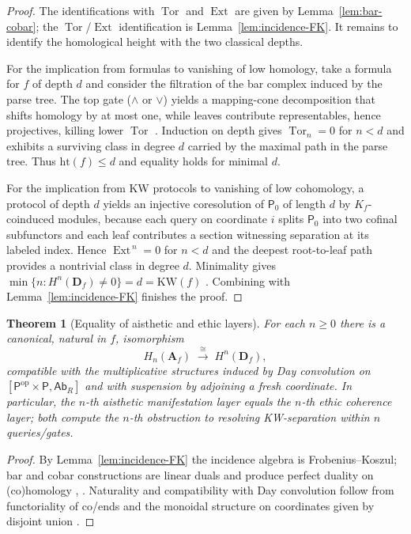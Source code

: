 \documentclass[12pt]{article}
\DeclareMathOperator{\Tor}{Tor}
\newcommand{\Ab}{\mathsf{Ab}}
\newcommand{\Ext}{\operatorname{Ext}}
\newcommand{\op}{\mathrm{op}}
\theoremstyle{plain}
\newtheorem{theorem}{Theorem}[section]
\theoremstyle{definition}
\theoremstyle{remark}
\numberwithin{equation}{section}
\begin{document}
\begin{proof}
The identifications with $\Tor$ and $\Ext$ are given by Lemma~\ref{lem:bar-cobar}; the $\Tor$/$\Ext$ identification is Lemma~\ref{lem:incidence-FK}. It remains to identify the homological height with the two classical depths.

For the implication from formulas to vanishing of low homology, take a formula for $f$ of depth $d$ and consider the filtration of the bar complex induced by the parse tree. The top gate ($\wedge$ or $\vee$) yields a mapping-cone decomposition that shifts homology by at most one, while leaves contribute representables, hence projectives, killing lower $\Tor$ \cite{Weibel1994}. Induction on depth gives $\Tor_n=0$ for $n<d$ and exhibits a surviving class in degree $d$ carried by the maximal path in the parse tree. Thus $\mathrm{ht}(f)\le d$ and equality holds for minimal $d$.

For the implication from KW protocols to vanishing of low cohomology, a protocol of depth $d$ yields an injective coresolution of $\mathsf P_0$ of length $d$ by $K_f$-coinduced modules, because each query on coordinate $i$ splits $\mathsf P_0$ into two cofinal subfunctors and each leaf contributes a section witnessing separation at its labeled index. Hence $\Ext^{\,n}=0$ for $n<d$ and the deepest root-to-leaf path provides a nontrivial class in degree $d$. Minimality gives $\min\{n:H^n(\mathbf D_f)\neq 0\}=d=\mathrm{KW}(f)$ \cite{KarchmerWigderson1990}. Combining with Lemma~\ref{lem:incidence-FK} finishes the proof.
\end{proof}

\begin{theorem}[Equality of aisthetic and ethic layers]\label{thm:layers}
For each $n\ge 0$ there is a canonical, natural in $f$, isomorphism
\[
H_n(\mathbf A_f)\;\xrightarrow{\;\cong\;}\;H^n(\mathbf D_f),
\]
compatible with the multiplicative structures induced by Day convolution on $[\mathsf P^{\op}\times\mathsf P,\Ab_R]$ and with suspension by adjoining a fresh coordinate. In particular, the $n$-th aisthetic manifestation layer equals the $n$-th ethic coherence layer; both compute the $n$-th obstruction to resolving KW-separation within $n$ queries/gates.
\end{theorem}

\begin{proof}
By Lemma~\ref{lem:incidence-FK} the incidence algebra is Frobenius--Koszul; bar and cobar constructions are linear duals and produce perfect duality on (co)homology \cite{Weibel1994}, \cite{Kelly1982}. Naturality and compatibility with Day convolution follow from functoriality of co/ends and the monoidal structure on coordinates given by disjoint union \cite{LeinsterBasic}.
\end{proof}
\end{document}
